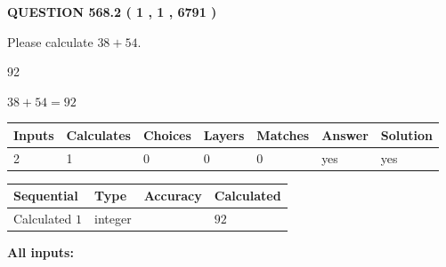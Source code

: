 \documentclass[12pt]{article}
\begin{document}
   
  
\vspace{0.2in}
  
{\textbf{\Large{QUESTION
568.2 
 ( 1 , 1 , 6791 )
}}}
  
  
 
Please calculate $ %
38 +  %
54 $.
 
 
 
\noindent{}
 
 

92
 
 
\noindent{}
 
 

 
 
 
\noindent{}
 
 

$ %
38 +  %
54=   %
92$
 
 
\noindent{}
 
 

 
   
   
   
   
\noindent\begin{tabular}{|l|l|l|l|l|l|l|}
 \hline
Inputs & Calculates & Choices & Layers & Matches & Answer & Solution \\ \hline
 2  & 
 1  & 
 0
  & 
 0  & 
 0  & 
  yes & 
  yes 
  \\ \hline
 \end{tabular}
   
   
   
   
\noindent{}
   
   
  
  
\noindent\begin{tabular}{|l|l|l|l|}
\hline
 Sequential & Type & Accuracy & Calculated \\ 
\hline
 
 
  Calculated $  1 $ & integer &  & 
  $ 92 $ 
 \\  \hline  
 \end{tabular}
   
   
   
   
\noindent\vspace{0.1in}\hspace{-0.08in} {\textbf{\Large{All inputs: }}}
   
\end{document}
